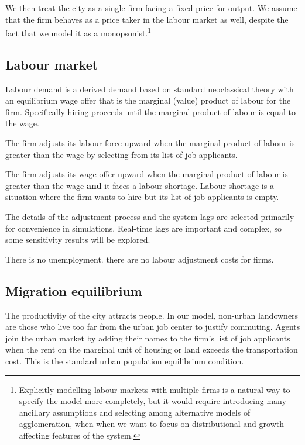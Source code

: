 We then treat the city as a single firm facing a fixed price for output. We assume that the firm behaves as a price taker in the labour market as well, despite  the fact that we  model it as a monopsonist.\footnote{Explicitly modelling labour markets with multiple firms is a natural way to specify the model more completely, but it would require introducing many ancillary assumptions and selecting among alternative models of agglomeration, when when we want to focus on distributional and growth-affecting features of the system.}



\subsection{Labour market}
Labour demand is a derived demand based on standard neoclassical theory with an equilibrium wage offer that is the marginal (value) product of labour for the firm. Specifically  hiring proceeds until the marginal product of labour  is equal to the wage.

The firm adjusts its labour force upward when the marginal product of labour is greater than the wage by selecting from its list of job applicants.


The firm adjusts its wage offer upward when the marginal product of labour is greater than the wage \textbf{and} it faces a labour shortage.  Labour shortage is a situation where the firm wants to hire but its list of job applicants is empty.

{\color{red}The details of the adjustment process and the system lags are selected primarily for convenience in simulations. Real-time lags are important and complex, so some sensitivity results will be explored.}

There is no unemployment. there are no labour adjustment costs for firms.



\subsection{Migration equilibrium}
The  productivity of the city attracts people.  In our model, non-urban landowners are those who live too far from the urban job center to justify commuting.  Agents join the urban market by adding their names to the firm's list of job applicants when the rent  on the marginal unit of housing or land exceeds the transportation cost. This is the  standard urban population equilibrium condition. 
   

